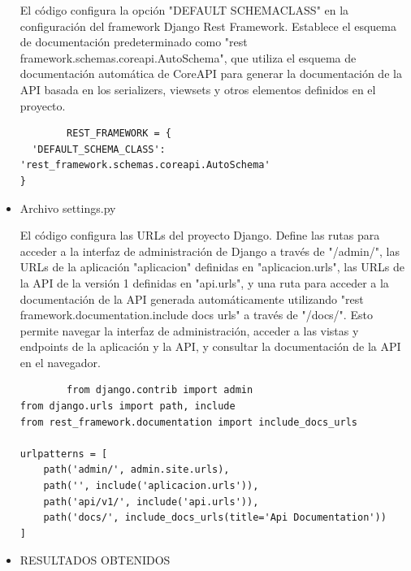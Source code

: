 \documentclass{article}
\begin{document}
\begin{itemize}
\begin{lstlisting}
  \end{lstlisting}
  
  El código configura la opción "DEFAULT SCHEMACLASS" en la configuración del framework Django Rest Framework. Establece el esquema de documentación predeterminado como "rest framework.schemas.coreapi.AutoSchema", que utiliza el esquema de documentación automática de CoreAPI para generar la documentación de la API basada en los serializers, viewsets y otros elementos definidos en el proyecto.
  
   \begin{lstlisting}
        REST_FRAMEWORK = {
  'DEFAULT_SCHEMA_CLASS': 'rest_framework.schemas.coreapi.AutoSchema'
}

  \end{lstlisting}

   \item Archivo settings.py
     
       El código configura las URLs del proyecto Django. Define las rutas para acceder a la interfaz de administración de Django a través de "/admin/", las URLs de la aplicación "aplicacion" definidas en "aplicacion.urls", las URLs de la API de la versión 1 definidas en "api.urls", y una ruta para acceder a la documentación de la API generada automáticamente utilizando "rest framework.documentation.include docs urls" a través de "/docs/". Esto permite navegar la interfaz de administración, acceder a las vistas y endpoints de la aplicación y la API, y consultar la documentación de la API en el navegador.
       
        \begin{lstlisting}
        from django.contrib import admin
from django.urls import path, include
from rest_framework.documentation import include_docs_urls

urlpatterns = [
    path('admin/', admin.site.urls),
    path('', include('aplicacion.urls')),
    path('api/v1/', include('api.urls')), 
    path('docs/', include_docs_urls(title='Api Documentation'))
]

  \end{lstlisting}

\item RESULTADOS OBTENIDOS


\end{itemize}
\end{document}
